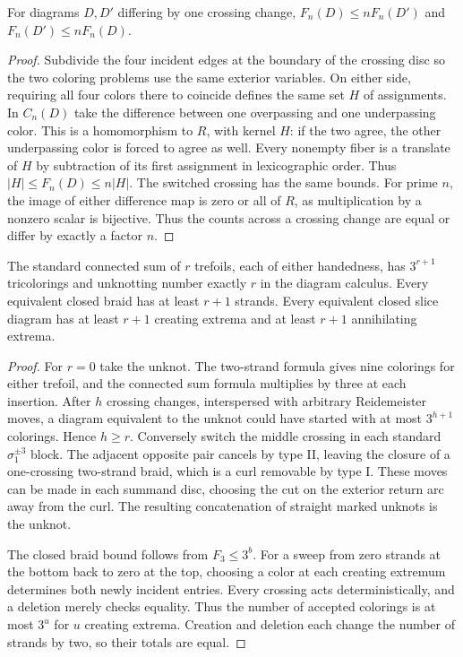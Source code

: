 \begin{proposition}
For diagrams $D,D'$ differing by one crossing change,
$F_n(D)\le nF_n(D')$ and $F_n(D')\le nF_n(D)$.
\end{proposition}
\begin{proof}
Subdivide the four incident edges at the boundary of the crossing disc
so the two coloring problems use the same exterior variables. On either
side, requiring all four colors there to coincide defines the same set
$H$ of assignments. In $C_n(D)$ take the difference between one
overpassing and one underpassing color. This is a homomorphism to $R$,
with kernel $H$: if the two agree, the other underpassing color is forced
to agree as well. Every nonempty fiber is a translate of $H$ by subtraction
of its first assignment in lexicographic order. Thus
$|H|\le F_n(D)\le n|H|$. The switched crossing has the same bounds.
For prime $n$, the image of either difference map is zero or all of $R$,
as multiplication by a nonzero scalar is bijective. Thus the counts
across a crossing change are equal or differ by exactly a factor $n$.
\end{proof}

\begin{corollary}
The standard connected sum of $r$ trefoils, each of either handedness, has
$3^{r+1}$ tricolorings and unknotting number exactly $r$ in the diagram
calculus. Every equivalent closed braid has at least $r+1$ strands.
Every equivalent closed slice diagram has at least $r+1$ creating extrema
and at least $r+1$ annihilating extrema.
\end{corollary}
\begin{proof}
For $r=0$ take the unknot. The two-strand formula gives nine colorings
for either trefoil, and the connected sum formula multiplies by three at
each insertion. After $h$ crossing changes, interspersed with arbitrary
Reidemeister moves, a diagram equivalent to the unknot could have started
with at most $3^{h+1}$ colorings. Hence $h\ge r$. Conversely switch the
middle crossing in each standard $\sigma_1^{\pm3}$ block. The adjacent
opposite pair cancels by type II, leaving the closure of a one-crossing
two-strand braid, which is a curl removable by type I. These moves can
be made in each summand disc, choosing the cut on the exterior return arc
away from the curl. The resulting concatenation of straight marked
unknots is the unknot.

The closed braid bound follows from $F_3\le3^b$. For a sweep from zero
strands at the bottom back to zero at the top, choosing a color at
each creating extremum determines both newly incident entries. Every
crossing acts deterministically, and a deletion merely checks equality.
Thus the number of accepted colorings is at most $3^u$ for $u$ creating
extrema. Creation and deletion each change the number of strands by two,
so their totals are equal.
\end{proof}

